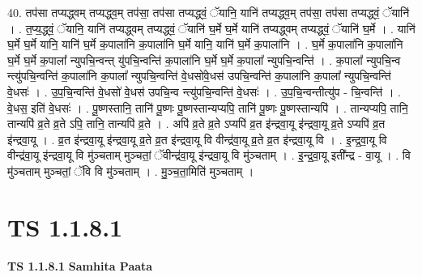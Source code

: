 \documentclass[17pt]{extarticle}
\begin{document}
40. तप॑सा तप्यद्ध्वम् तप्यद्ध्व॒म् तप॑सा॒ तप॑सा तप्यद्ध्वं॒ ॅयानि॒ यानि॑ तप्यद्ध्व॒म् तप॑सा॒ तप॑सा तप्यद्ध्वं॒ ॅयानि॑ । . त॒प्य॒द्ध्वं॒ ॅयानि॒ यानि॑ तप्यद्ध्वम् तप्यद्ध्वं॒ ॅयानि॑ घ॒र्मे घ॒र्मे यानि॑ तप्यद्ध्वम् तप्यद्ध्वं॒ ॅयानि॑ घ॒र्मे । . यानि॑ घ॒र्मे घ॒र्मे यानि॒ यानि॑ घ॒र्मे क॒पाला॑नि क॒पाला॑नि घ॒र्मे यानि॒ यानि॑ घ॒र्मे क॒पाला॑नि । . घ॒र्मे क॒पाला॑नि क॒पाला॑नि घ॒र्मे घ॒र्मे क॒पाला᳚ न्युपचि॒न्वन्त् यु॑पचि॒न्वन्ति॑ क॒पाला॑नि घ॒र्मे घ॒र्मे 
क॒पाला᳚ न्युपचि॒न्वन्ति॑ । . क॒पाला᳚ न्युपचि॒न्व न्त्यु॑पचि॒न्वन्ति॑ क॒पाला॑नि क॒पाला᳚ न्युपचि॒न्वन्ति॑ वे॒धसो॑वे॒धस॑ उपचि॒न्वन्ति॑ क॒पाला॑नि क॒पाला᳚ न्युपचि॒न्वन्ति॑ वे॒धसः॑ । . उ॒प॒चि॒न्वन्ति॑ वे॒धसो॑ वे॒धस॑ उपचि॒न्व न्त्यु॑पचि॒न्वन्ति॑ वे॒धसः॑ । . उ॒प॒चि॒न्वन्तीत्यु॑प - चि॒न्वन्ति॑ । . वे॒धस॒ इति॑ वे॒धसः॑ । . पू॒ष्णस्तानि॒ तानि॑ पू॒ष्णः पू॒ष्णस्तान्यप्यपि॒ तानि॑ पू॒ष्णः पू॒ष्णस्तान्यपि॑ । . तान्यप्यपि॒ तानि॒ तान्यपि॑ व्र॒ते व्र॒ते ऽपि॒ तानि॒ तान्यपि॑ व्र॒ते । . अपि॑ व्र॒ते व्र॒ते ऽप्यपि॑ व्र॒त इ॑न्द्रवा॒यू इ॑न्द्रवा॒यू व्र॒ते ऽप्यपि॑ व्र॒त इ॑न्द्रवा॒यू । . व्र॒त इ॑न्द्रवा॒यू इ॑न्द्रवा॒यू व्र॒ते व्र॒त इ॑न्द्रवा॒यू वि वीन्द्र॑वा॒यू व्र॒ते व्र॒त इ॑न्द्रवा॒यू वि । . इ॒न्द्र॒वा॒यू वि वीन्द्र॑वा॒यू इ॑न्द्रवा॒यू वि मु॑ञ्चताम् मुञ्चतां॒ ॅवीन्द्र॑वा॒यू इ॑न्द्रवा॒यू वि मु॑ञ्चताम् । . इ॒न्द्र॒वा॒यू इती᳚न्द्र - वा॒यू । . वि मु॑ञ्चताम् मुञ्चतां॒ ॅवि वि मु॑ञ्चताम् । . मु॒ञ्च॒ता॒मिति॑ मुञ्चताम् । \newline
\pagebreak
{}

\section{ TS 1.1.8.1 }

\textbf{TS 1.1.8.1 } \newline
\textbf{Samhita Paata} \newline
\end{document}
